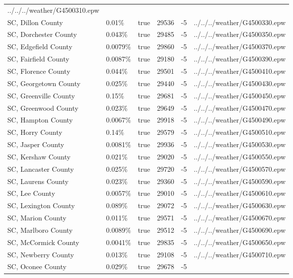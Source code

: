 \begin{longtable}[]{@{}llllll@{}}
../../../weather/G4500310.epw \\
SC, Dillon County & 0.01\% & true & 29536 & -5 &
../../../weather/G4500330.epw \\
SC, Dorchester County & 0.043\% & true & 29485 & -5 &
../../../weather/G4500350.epw \\
SC, Edgefield County & 0.0079\% & true & 29860 & -5 &
../../../weather/G4500370.epw \\
SC, Fairfield County & 0.0087\% & true & 29180 & -5 &
../../../weather/G4500390.epw \\
SC, Florence County & 0.044\% & true & 29501 & -5 &
../../../weather/G4500410.epw \\
SC, Georgetown County & 0.025\% & true & 29440 & -5 &
../../../weather/G4500430.epw \\
SC, Greenville County & 0.15\% & true & 29681 & -5 &
../../../weather/G4500450.epw \\
SC, Greenwood County & 0.023\% & true & 29649 & -5 &
../../../weather/G4500470.epw \\
SC, Hampton County & 0.0067\% & true & 29918 & -5 &
../../../weather/G4500490.epw \\
SC, Horry County & 0.14\% & true & 29579 & -5 &
../../../weather/G4500510.epw \\
SC, Jasper County & 0.0081\% & true & 29936 & -5 &
../../../weather/G4500530.epw \\
SC, Kershaw County & 0.021\% & true & 29020 & -5 &
../../../weather/G4500550.epw \\
SC, Lancaster County & 0.025\% & true & 29720 & -5 &
../../../weather/G4500570.epw \\
SC, Laurens County & 0.023\% & true & 29360 & -5 &
../../../weather/G4500590.epw \\
SC, Lee County & 0.0057\% & true & 29010 & -5 &
../../../weather/G4500610.epw \\
SC, Lexington County & 0.089\% & true & 29072 & -5 &
../../../weather/G4500630.epw \\
SC, Marion County & 0.011\% & true & 29571 & -5 &
../../../weather/G4500670.epw \\
SC, Marlboro County & 0.0089\% & true & 29512 & -5 &
../../../weather/G4500690.epw \\
SC, McCormick County & 0.0041\% & true & 29835 & -5 &
../../../weather/G4500650.epw \\
SC, Newberry County & 0.013\% & true & 29108 & -5 &
../../../weather/G4500710.epw \\
SC, Oconee County & 0.029\% & true & 29678 & -5 &

\end{longtable}
